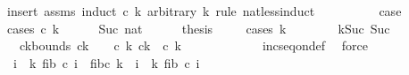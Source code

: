 \begin{isabellebody}
%
\isadelimproof
%
\endisadelimproof
%
\isatagproof
{}\isamarkupfalse%
{\isacharparenleft}{\kern0pt}insert\ assms{\isacharcomma}{\kern0pt}\ induct\ {\isachardoublequoteopen}c\ k{\isachardoublequoteclose}\ arbitrary{\isacharcolon}{\kern0pt}\ k\ rule{\isacharcolon}{\kern0pt}\ nat{\isacharunderscore}{\kern0pt}less{\isacharunderscore}{\kern0pt}induct{\isacharparenright}{\kern0pt}\isanewline
\ \ \isamarkupfalse%
\ {}\isanewline
\ \ \isamarkupfalse%
\ \isamarkupfalse%
\ {\isacharquery}{\kern0pt}case\isanewline
\ \ \isamarkupfalse%
{\isacharparenleft}{\kern0pt}cases\ {\isachardoublequoteopen}c\ k{\isachardoublequoteclose}{\isacharparenright}{\kern0pt}\isanewline
\ \ \ \ \isamarkupfalse%
\ {\isacharparenleft}{\kern0pt}Suc\ nat{\isacharparenright}{\kern0pt}\isanewline
\ \ \ \ \isamarkupfalse%
\ {\isacharquery}{\kern0pt}thesis\isanewline
\ \ \ \ \isamarkupfalse%
{\isacharparenleft}{\kern0pt}cases\ k{\isacharparenright}{\kern0pt}\isanewline
\ \ \ \ \ \ \isamarkupfalse%
\ k{\isacharunderscore}{\kern0pt}Suc{\isacharcolon}{\kern0pt}\ {\isacharparenleft}{\kern0pt}Suc\ {\isacharunderscore}{\kern0pt}{\isacharparenright}{\kern0pt}\isanewline
\ \ \ \ \ \ \isamarkupfalse%
\ \ ck{\isacharunderscore}{\kern0pt}bounds{\isacharcolon}{\kern0pt}\ {\isachardoublequoteopen}c{\isacharparenleft}{\kern0pt}k{\isacharminus}{\kern0pt}{}{\isacharparenright}{\kern0pt}\ {\isacharplus}{\kern0pt}\ {}\ {\isacharless}{\kern0pt}\ c\ k{\isachardoublequoteclose}\ {\isachardoublequoteopen}c{\isacharparenleft}{\kern0pt}k{\isacharminus}{\kern0pt}{}{\isacharparenright}{\kern0pt}\ {\isacharless}{\kern0pt}\ c\ k{\isachardoublequoteclose}\isanewline
\ \ \ \ \ \ \ \ \isamarkupfalse%
\ {}{\isacharparenleft}{\kern0pt}{}{\isacharparenright}{\kern0pt}\ \isamarkupfalse%
\ inc{\isacharunderscore}{\kern0pt}seq{\isacharunderscore}{\kern0pt}on{\isacharunderscore}{\kern0pt}def\ \isamarkupfalse%
\ {\isacharparenleft}{\kern0pt}force{\isacharparenright}{\kern0pt}{\isacharplus}{\kern0pt}\isanewline
\ \ \ \ \ \ \isamarkupfalse%
\ \isamarkupfalse%
\ {\isachardoublequoteopen}{\isacharparenleft}{\kern0pt}{\isasymSum}i\ {\isacharequal}{\kern0pt}\ {}{\isachardot}{\kern0pt}{\isachardot}{\kern0pt}k{\isachardot}{\kern0pt}\ fib\ {\isacharparenleft}{\kern0pt}c\ i{\isacharparenright}{\kern0pt}{\isacharparenright}{\kern0pt}\ {\isacharequal}{\kern0pt}\ fib{\isacharparenleft}{\kern0pt}c\ k{\isacharparenright}{\kern0pt}\ {\isacharplus}{\kern0pt}\ {\isacharparenleft}{\kern0pt}{\isasymSum}i\ {\isacharequal}{\kern0pt}\ {}{\isachardot}{\kern0pt}{\isachardot}{\kern0pt}k{\isacharminus}{\kern0pt}{}{\isachardot}{\kern0pt}\ fib\ {\isacharparenleft}{\kern0pt}c\ i{\isacharparenright}{\kern0pt}{\isacharparenright}{\kern0pt}{\isachardoublequoteclose}\ \isanewline

\end{isabellebody}
